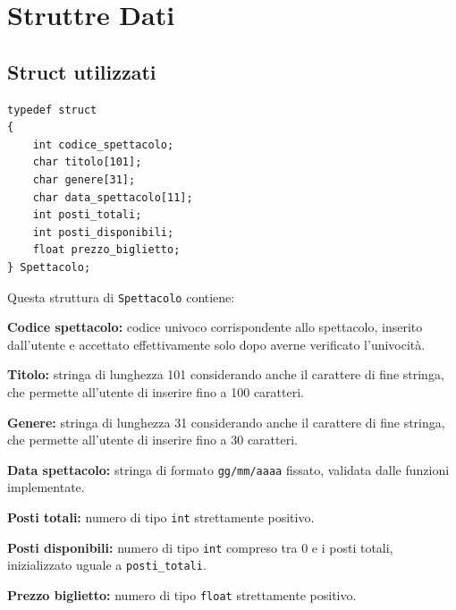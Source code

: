 \documentclass[11pt,a4paper,oneside,openany]{book}
\newenvironment{listacomp}{%
    \small
    \begin{list}{\textendash}{%
        \setlength{\topsep}{2pt}%
        \setlength{\partopsep}{0pt}%
        \setlength{\itemsep}{1pt}%
        \setlength{\parsep}{0pt}%
        \setlength{\leftmargin}{1.2em}%
    }%
}{%
    \end{list}%
}
\begin{document}
\section{Struttre Dati}
\subsection{Struct utilizzati}
\begin{lstlisting}[caption={Definizione della struttura Spettacolo}]
typedef struct
{
    int codice_spettacolo;
    char titolo[101];
    char genere[31];
    char data_spettacolo[11];
    int posti_totali;
    int posti_disponibili;
    float prezzo_biglietto;
} Spettacolo;
\end{lstlisting}
Questa struttura di \texttt{Spettacolo} contiene:
\begin{listacomp}
    \item \textbf{Codice spettacolo:} codice univoco corrispondente allo spettacolo, inserito dall'utente e accettato effettivamente solo dopo averne verificato l'univocità.
    \item \textbf{Titolo:} stringa di lunghezza 101 considerando anche il carattere di fine stringa, che permette all'utente di inserire fino a 100 caratteri.
    \item \textbf{Genere:} stringa di lunghezza 31 considerando anche il carattere di fine stringa, che permette all'utente di inserire fino a 30 caratteri.
    \item \textbf{Data spettacolo:} stringa di formato \texttt{gg/mm/aaaa} fissato, validata dalle funzioni implementate.
    \item \textbf{Posti totali:} numero di tipo \texttt{int} strettamente positivo.
    \item \textbf{Posti disponibili:} numero di tipo \texttt{int} compreso tra 0 e i posti totali, inizializzato uguale a \texttt{posti\_totali}.
    \item \textbf{Prezzo biglietto:} numero di tipo \texttt{float} strettamente positivo.
\end{listacomp}
\end{document}
